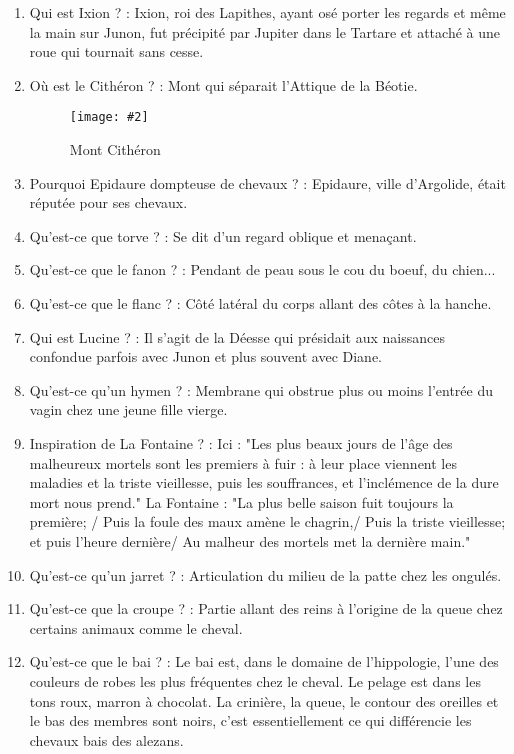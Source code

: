 \documentclass[a4paper, 11pt, hidelinks]{article}
\newcommand{\img}[4]{\begin{figure}[!ht]
    \centering
    \texttt{[image: \#2]}
    \caption{#3}
    \label{#4}
    \end{figure} }
\begin{document}
\begin{enumerate}
      \item Qui est Ixion ? : Ixion, roi des Lapithes, ayant osé porter les regards et même la main sur Junon, fut précipité par Jupiter dans le Tartare et attaché à une roue qui tournait sans cesse.
      \item Où est le Cithéron ? : Mont qui séparait l'Attique de la Béotie.
            \img{0.4}{Cithéron.png}{Mont Cithéron}{116}
            \newpage
      \item Pourquoi Epidaure dompteuse de chevaux ? : Epidaure, ville d'Argolide, était réputée pour ses chevaux.
      \item Qu'est-ce que torve ? : Se dit d'un regard oblique et menaçant.
      \item Qu'est-ce que le fanon ? : Pendant de peau sous le cou du boeuf, du chien...
      \item Qu'est-ce que le flanc ? : Côté latéral du corps allant des côtes à la hanche.
      \item Qui est Lucine ? : Il s'agit de la Déesse qui présidait aux naissances confondue parfois avec Junon et plus souvent avec Diane.
      \item Qu'est-ce qu'un hymen ? : Membrane qui obstrue plus ou moins l'entrée du vagin chez une jeune fille vierge.
      \item Inspiration de La Fontaine ? : Ici : "Les plus beaux jours de l'âge des malheureux mortels sont les premiers à fuir : à leur place viennent les maladies et la triste vieillesse,
                                                puis les souffrances, et l'inclémence de la dure mort nous prend." La Fontaine : "La plus belle saison fuit toujours la première; / 
                                                Puis la foule des maux amène le chagrin,/ Puis la triste vieillesse; et puis l'heure dernière/ Au malheur des mortels met la dernière main."
      \item Qu'est-ce qu'un jarret ? : Articulation du milieu de la patte chez les ongulés.
      \item Qu'est-ce que la croupe ? : Partie allant des reins à l'origine de la queue chez certains animaux comme le cheval.
      \item Qu'est-ce que le bai ? : Le bai est, dans le domaine de l'hippologie, l'une des couleurs de robes les plus fréquentes chez le cheval. Le pelage est dans les tons roux, marron à chocolat.
            La crinière, la queue, le contour des oreilles et le bas des membres sont noirs, c'est essentiellement ce qui différencie les chevaux bais des alezans.

\end{enumerate}
\end{document}
